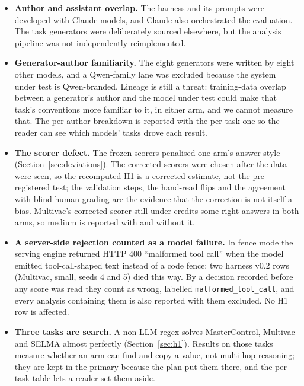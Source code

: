 \documentclass[11pt]{article}
\newcommand{\code}[1]{\texttt{#1}}
\begin{document}
\begin{itemize}[leftmargin=*]
  done. Four plain answers in the pilot could not be re-graded.
\item \textbf{Author and assistant overlap.} The harness and its prompts were
  developed with Claude models, and Claude also orchestrated the evaluation. The
  task generators were deliberately sourced elsewhere, but the analysis pipeline was
  not independently reimplemented.
\item \textbf{Generator-author familiarity.} The eight generators were written by eight
  other models, and a Qwen-family lane was excluded because the system under test is
  Qwen-branded. Lineage is still a threat: training-data overlap between a generator's
  author and the model under test could make that task's conventions more familiar to
  it, in either arm, and we cannot measure that. The per-author breakdown is reported
  with the per-task one so the reader can see which models' tasks drove each result.
\item \textbf{The scorer defect.} The frozen scorers penalised one arm's answer style
  (Section~\ref{sec:deviations}). The corrected scorers were chosen after the data were
  seen, so the recomputed H1 is a corrected estimate, not the pre-registered test; the
  validation steps, the hand-read flips and the agreement with blind human grading are
  the evidence that the correction is not itself a bias. Multivac's corrected scorer
  still under-credits some right answers in both arms, so medium is reported with and
  without it.
\item \textbf{A server-side rejection counted as a model failure.} In fence mode the
  serving engine returned HTTP 400 ``malformed tool call'' when the model emitted
  tool-call-shaped text instead of a code fence; two harness v0.2 rows (Multivac, small,
  seeds 4 and 5) died this way. By a decision recorded before any score was read they
  count as wrong, labelled \code{malformed\_tool\_call}, and every analysis containing
  them is also reported with them excluded. No H1 row is affected.
\item \textbf{Three tasks are search.} A non-LLM regex solves MasterControl, Multivac
  and SELMA almost perfectly (Section~\ref{sec:h1}). Results on those tasks measure
  whether an arm can find and copy a value, not multi-hop reasoning; they are kept in
  the primary because the plan put them there, and the per-task table lets a reader set
  them aside.
\end{itemize}

\end{document}
